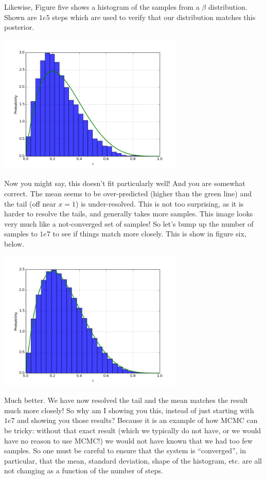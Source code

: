 \documentclass{article}
\begin{document}
Likewise, Figure five shows a histogram of the samples from a $\beta$ distribution. 
Shown are $1e5$ steps which are used to verify that our distribution matches this posterior. 

\begin{center}
 \includegraphics[width=3.5in]{figs/hist-beta}
\end{center}

Now you might say, this doesn't fit particularly well! And you are somewhat correct. 
The mean seems to be over-predicted (higher than the green line) and the tail (off near $x=1$) is under-resolved. 
This is not too surprising, as it is harder to resolve the tails, and generally takes more samples. This image looks very much like 
a not-converged set of samples! So let's bump up the number of samples to $1e7$ to see if things match more closely. This is show in figure six, below.

\begin{center}
  \includegraphics[width=3.5in]{figs/hist-beta_10e7}
\end{center}

Much better. We have now resolved the tail and the mean matches the result much more closely! So why am I showing you this, instead of 
just starting with $1e7$ and showing you those results? Because it is an example of how MCMC can be tricky: without that exact result 
(which we typically do not have, or we would have no reason to use MCMC!) we would not have known that we had too few samples. So one must be careful to ensure that
the system is ``converged'', in particular, that the mean, standard deviation, shape of the histogram, etc. are all not changing as a function of the number of steps. 
\end{document}
